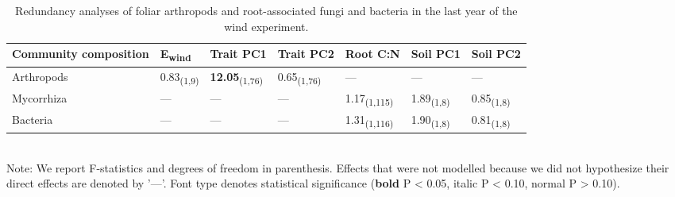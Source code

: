 \documentclass[11pt]{article}
\begin{document}
\begin{table}
\centering
\caption{Redundancy analyses of foliar arthropods and
root-associated fungi and bacteria in the last year of the wind experiment.}
\label{wRedund}
\begin{tabular}{@{}lllllll@{}}
\toprule
Community composition & E\textsubscript{wind} & Trait PC1 &
Trait PC2 & Root C:N & Soil PC1 &
Soil PC2\tabularnewline
\midrule
Arthropods & 0.83\textsubscript{(1,9)} & \textbf{12.05}\textsubscript{(1,76)} & 0.65\textsubscript{(1,76)} & --- & --- &
---\tabularnewline
Mycorrhiza & --- & --- & --- & 1.17\textsubscript{(1,115)} & 1.89\textsubscript{(1,8)} &
0.85\textsubscript{(1,8)}\tabularnewline
Bacteria & --- & --- & --- & 1.31\textsubscript{(1,116)} & 1.90\textsubscript{(1,8)} &
0.81\textsubscript{(1,8)}\tabularnewline
\bottomrule
\end{tabular}
\bigskip{}
\\
{\footnotesize Note: We report F-statistics and degrees
of freedom in parenthesis. Effects that were not modelled because we did not hypothesize their direct effects are denoted by '---'. Font type denotes statistical significance
(\textbf{bold} P \textless{} 0.05, italic P \textless{} 0.10, normal P
\textgreater{} 0.10).}
\end{table}

\newpage{}




\end{document}
